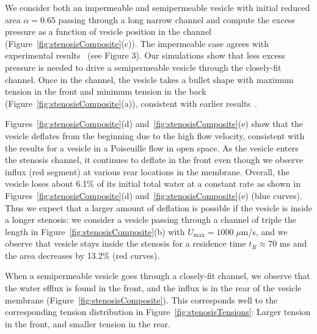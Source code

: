 \documentclass[prb,preprint,showpacs,preprintnumbers,amsmath,amssymb,longbibliography]{revtex4-1}
\begin{document}
We consider both an impermeable and semipermeable vesicle with initial
reduced area $\alpha = 0.65$ passing through a long narrow channel and
compute the excess pressure as a function of vesicle position in the
channel (Figure~\ref{fig:stenosisComposite}(c)). The impermeable case
agrees with experimental results~\cite{abk-fai-sto2006} (see Figure 3).
Our simulations show that less excess pressure is needed to drive a
semipermeable vesicle through the closely-fit channel. Once in the
channel, the vesicle takes a bullet shape with maximum tension in the
front and minimum tension in the back
(Figure~\ref{fig:stenosisComposite}(a)), consistent with earlier
results~\cite{Pak2015_PNAS, HarmanBertrandJoos2017_CJP}.

Figures~\ref{fig:stenosisComposite}(d)
and~\ref{fig:stenosisComposite}(e) show that the vesicle deflates from
the beginning due to the high flow velocity, consistent with the results
for a vesicle in a Poiseuille flow in open space. As the vesicle enters
the stenosis channel, it continues to deflate in the front even though
we observe influx (red segment) at various rear locations in the
membrane. Overall, the vesicle loses about 6.1\% of its initial total
water at a constant rate as shown in
Figures~\ref{fig:stenosisComposite}(d)
and~\ref{fig:stenosisComposite}(e) (blue curves). Thus we expect that a
larger amount of deflation is possible if the vesicle is inside a longer
stenosis: we consider a vesicle passing through a channel of triple the
length in Figure~\ref{fig:stenosisComposite}(b) with
$U_{\max}=1000\;\mu$m/s, and we observe that vesicle stays inside the
stenosis for a residence time $t_R \approx 70$ ms and the area decreases
by 13.2\% (red curves).

When a semipermeable vesicle goes through a closely-fit channel, we observe that the water efflux is found in the front, and the influx is in the rear of the vesicle membrane (Figure~\ref{fig:stenosisComposite}). This corresponds well to the corresponding tension distribution in Figure~\ref{fig:stenosisTensions}: Larger tension in the front, and smaller tension in the rear.
\end{document}
